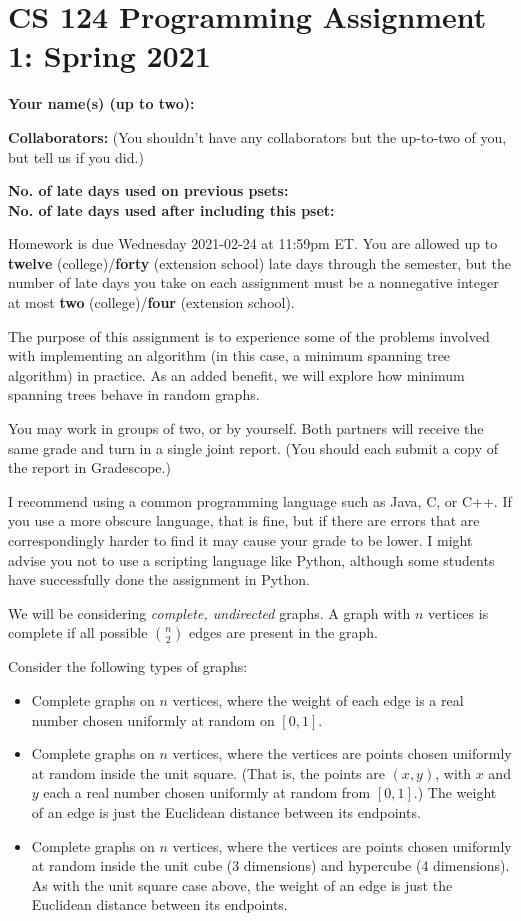 \documentclass[11pt]{article}
\begin{document}
	
	\section*{CS 124 Programming Assignment 1: Spring 2021}
 		
	\textbf{Your name(s) (up to two):} 
		
	\textbf{Collaborators:} (You shouldn't have any collaborators but the up-to-two of you, but tell us if you did.)

	\textbf{No. of late days used on previous psets: }\\
	\textbf{No. of late days used after including this pset: }

Homework is due Wednesday 2021-02-24 at 11:59pm ET. You are allowed up to {\bf twelve} (college)/{\bf forty} (extension school) late days through the semester, but the number of late days you take on each assignment must be a nonnegative integer at most {\bf two} (college)/{\bf four} (extension school).

The purpose of this assignment is to experience some of the problems
involved with implementing an algorithm (in this case, a minimum
spanning tree algorithm) in practice.  As an added benefit, we will
explore how minimum spanning trees behave in random graphs.

You may work in groups of two, or by yourself.  Both partners will
receive the same grade and turn in a single joint report.
(You should each submit a copy of the report in Gradescope.)

I recommend using a common programming language such as Java, C, or
C++.  If you use a more obscure language, that is fine, but if there are
errors that are correspondingly harder to find it may cause your grade
to be lower.  I might advise you not to use a scripting language like
Python, although some students have successfully done the assignment
in Python.

We will be considering {\em complete, undirected} graphs.  A graph
with $n$ vertices is complete if all possible $n \choose 2$ edges are
present in the graph.

Consider the following types of graphs:
\begin{itemize}
\item Complete graphs on $n$ vertices, where the weight of each edge
is a real number chosen uniformly at random on $[0,1]$.
\item Complete graphs on $n$ vertices, where the vertices are points
chosen uniformly at random inside the unit square.  (That is, the points
are $(x,y)$, with $x$ and $y$ each a real number chosen uniformly at
random from $[0,1]$.)  The weight of an edge is just the Euclidean
distance between its endpoints.  
\item Complete graphs on $n$ vertices, where the vertices are points
chosen uniformly at random inside the unit cube (3 dimensions) and
hypercube (4 dimensions).  As with the unit square case above, the
weight of an edge is just the Euclidean distance between its
endpoints.
\end{itemize}
\end{document}
